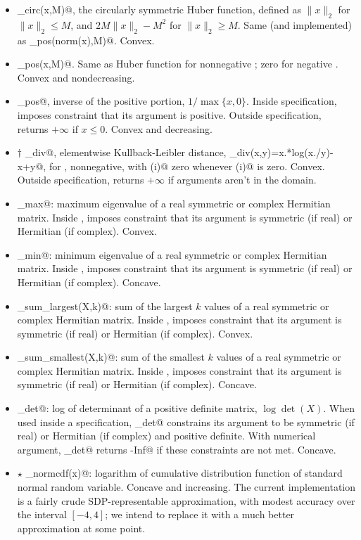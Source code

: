 \documentclass[12pt]{article}
\begin{document}
\begin{itemize}
\item \verb@huber_circ(x,M)@, the circularly symmetric Huber function,
defined as $\|x\|_2$ for $\|x\|_2 \leq M$, and
$2M\|x\|_2-M^2$ for $\|x\|_2 \geq M$.
Same (and implemented) as \verb@huber_pos(norm(x),M)@. Convex.

\item \verb@huber_pos(x,M)@.  
Same as Huber function for nonnegative \verb@x@; zero for negative \verb@x@.
Convex and nondecreasing. 

\item \verb@inv_pos@, inverse of the positive portion, $1/\max\{x,0\}$.
Inside \cvx specification,
imposes constraint that its argument is positive.
Outside \cvx specification, returns $+\infty$ if $x\leq 0$.
Convex and decreasing.
\item $\dagger$ \verb@kl_div@, elementwise Kullback-Leibler distance,
\verb@kl_div(x,y)=x.*log(x./y)-x+y@, for \verb@x@, \verb@y@ nonnegative,
with \verb@x(i)@ zero whenever \verb@y(i)@ is zero.  Convex.
Outside \cvx specification, returns $+\infty$ if arguments aren't
in the domain.

\item \verb@lambda_max@: maximum eigenvalue of a real symmetric 
or complex Hermitian matrix.
Inside \cvx, imposes constraint that its argument 
is symmetric (if real) or Hermitian (if complex).
Convex.
\item \verb@lambda_min@: minimum eigenvalue of a real symmetric 
or complex Hermitian matrix.
Inside \cvx, imposes constraint that its argument 
is symmetric (if real) or Hermitian (if complex).
Concave.
\item \verb@lambda_sum_largest(X,k)@: sum of the largest $k$ values of a real
symmetric or complex Hermitian matrix.
Inside \cvx, imposes constraint that its argument 
is symmetric (if real) or Hermitian (if complex).
Convex.
\item \verb@lambda_sum_smallest(X,k)@: sum of the smallest $k$ values of a real
symmetric or complex Hermitian matrix.
Inside \cvx, imposes constraint that its argument 
is symmetric (if real) or Hermitian (if complex).
Concave.

\item \verb@log_det@: log of determinant of a positive definite matrix,
$\log \det(X)$.
When used inside a \cvx specification, \verb@log_det@ constrains
its argument to be symmetric (if real) or Hermitian (if complex) and 
positive definite. 
With numerical argument, \verb@log_det@ returns \verb@-Inf@ if these
constraints are not met. Concave.
\item $\star$ \verb@log_normcdf(x)@: logarithm of cumulative distribution
function of standard normal random variable.  Concave and increasing.
The current implementation is a fairly crude SDP-representable approximation,
with modest accuracy over the interval $[-4,4]$; we intend to replace it
with a much better approximation at some point.


\end{itemize}
\end{document}
